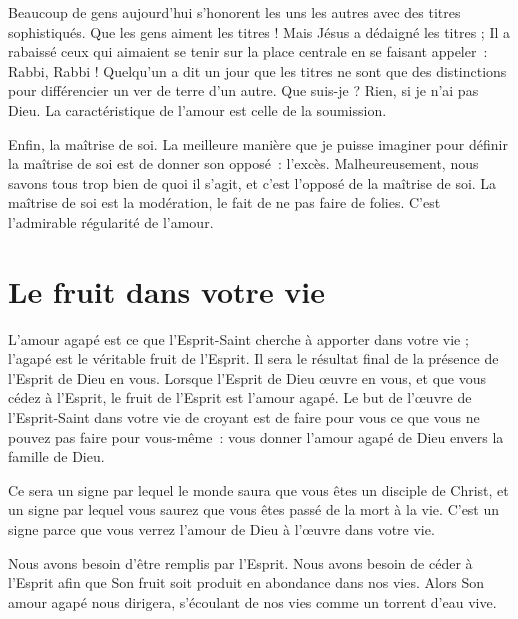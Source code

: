 Beaucoup de gens aujourd'hui s'honorent les uns les autres
 avec des titres sophistiqués. Que les gens aiment les titres !
 Mais Jésus a dédaigné les titres ; Il a rabaissé ceux qui aimaient
 se tenir sur la place centrale en se faisant appeler~:
 \og Rabbi, Rabbi ! \fg{}
 Quelqu'un a dit un jour que les titres ne sont que des distinctions
 pour différencier un ver de terre d'un autre. Que suis-je ?
 Rien, si je n'ai pas Dieu. La caractéristique de l'amour
 est celle de la soumission.

Enfin, la maîtrise de soi. La meilleure manière que je puisse imaginer
 pour définir la maîtrise de soi est de donner son opposé~: l'excès.
 Malheureusement, nous savons tous trop bien de quoi il s'agit,
 et c'est l'opposé de la maîtrise de soi.
 La maîtrise de soi est la modération, le fait de ne pas faire de folies.
 C'est l'admirable régularité de l'amour.


\section*{Le fruit dans votre vie}

L'amour agapé est ce que l'Esprit-Saint cherche à apporter dans votre vie ;
 l'agapé est le véritable fruit de l'Esprit.
 Il sera le résultat final de la présence de l'Esprit de Dieu en vous.
 Lorsque l'Esprit de Dieu œuvre en vous, et que vous cédez à l'Esprit,
 le fruit de l'Esprit est l'amour agapé. Le but de l'œuvre de
 l'Esprit-Saint dans votre vie de croyant est de faire pour vous
 ce que vous ne pouvez pas faire pour vous-même~:
 vous donner l'amour agapé de Dieu envers la famille de Dieu.

Ce sera un signe par lequel le monde saura que vous êtes un disciple
 de Christ, et un signe par lequel vous saurez que vous êtes passé
 de la mort à la vie. C'est un signe parce que vous verrez
 l'amour de Dieu à l'œuvre dans votre vie.

Nous avons besoin d'être remplis par l'Esprit.
 Nous avons besoin de céder à l'Esprit afin que Son fruit soit produit
 en abondance dans nos vies. Alors Son amour agapé nous dirigera,
 s'écoulant de nos vies comme un torrent d'eau vive.
\closechapter

